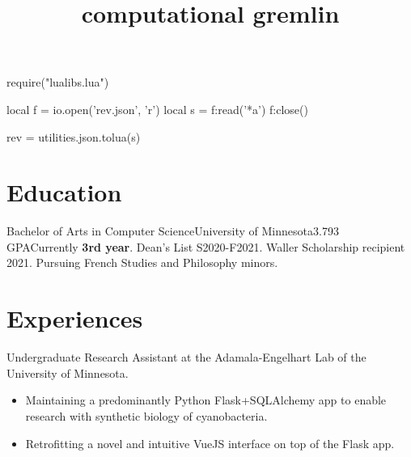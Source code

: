 \documentclass{moderncv}
\title{computational gremlin}
\newcommand{\comment}[1]{}
\begin{document}
\begin{luacode}
require("lualibs.lua")

local f = io.open('rev.json', 'r')
local s = f:read('*a')
f:close()

rev = utilities.json.tolua(s)
\end{luacode}

\newcommand{\githash}
{
  \href{https://github.com/knownunown/website/blob/\luadirect{tex.sprint(rev)}/cv.tex}
  {\texttt{\luadirect{tex.sprint(rev)}}}
}

\makecvtitle{}
\vspace*{-5mm} %

\section{Education}
{
  Bachelor of Arts in Computer Science}{University of Minnesota}{}{3.793 GPA}{Currently \textbf{3rd year}. Dean's List S2020-F2021. Waller Scholarship recipient 2021. Pursuing French Studies and Philosophy minors.
}

\comment{
\subsection{selected CSCI coursework}
\cvlistitem{CSCI2021, Machine Architecture and Organization}
\cvlistitem{CSCI2041, Advanced Programming Principles}
\cvlistitem{CSCI2033, Elementary Computational Linear Algebra}
\cvlistitem{CSCI5551, Introduction to Intelligent Robotic Systems (in-progress)}
\cvlistitem{CSCI4611, Programming Interactive Computer Graphics and Games (in-progress)}
}

\section{Experiences}
{
  Undergraduate Research Assistant at the Adamala-Engelhart Lab of the University of Minnesota.
  \begin{itemize}[label=\textbullet,noitemsep]
  \item Maintaining a predominantly Python Flask+SQLAlchemy app to enable research with synthetic biology of cyanobacteria.
  \item Retrofitting a novel and intuitive VueJS interface on top of the Flask app.
  \end{itemize}
}
   
\end{document}
